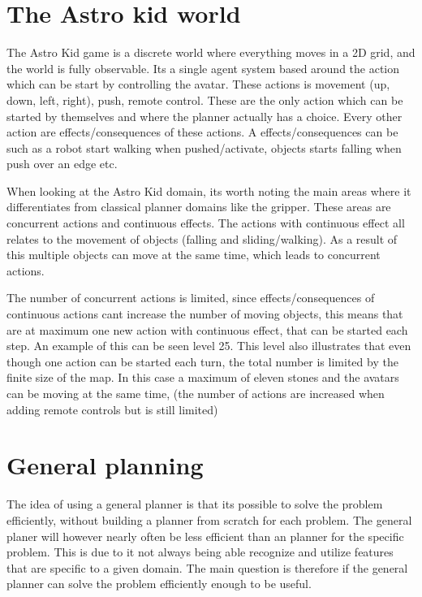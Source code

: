 	\section{The Astro kid world}
	The Astro Kid game is a discrete world where everything moves in a 2D grid, and the world is fully observable. Its a single agent system based around the action which can be start by controlling the avatar. These actions is movement (up, down, left, right), push, remote control. These are the only action which can be started by themselves and where the planner actually has a choice. Every other action are effects/consequences of these actions. A effects/consequences can be such as a robot start walking when pushed/activate, objects starts falling when push over an edge etc.
	
	When looking at the Astro Kid domain, its worth noting the main areas where it differentiates from classical planner domains like the gripper. These areas are concurrent actions and continuous effects. The actions with continuous effect all relates to the movement of objects (falling and sliding/walking). As a result of this multiple objects can move at the same time, which leads to concurrent actions.
	
	The number of concurrent actions is limited, since effects/consequences of continuous actions cant increase the number of moving objects, this means that are at maximum one new action with continuous effect, that can be started each step. An example of this can be seen level 25. This level also illustrates that even though one action can be started each turn, the total number is limited by the finite size of the map. In this case a maximum of eleven stones and the avatars can be moving at the same time, (the number of actions are increased when adding remote controls but is still limited)

\section{General planning}
	The idea of using a general planner is that its possible to solve the problem efficiently, without building a planner from scratch for each problem. The general planer will however nearly often be less efficient than an planner for the specific problem. This is due to it not always being able recognize and utilize features that are specific to a given domain. The main question is therefore if the general planner can solve the problem efficiently enough to be useful.

